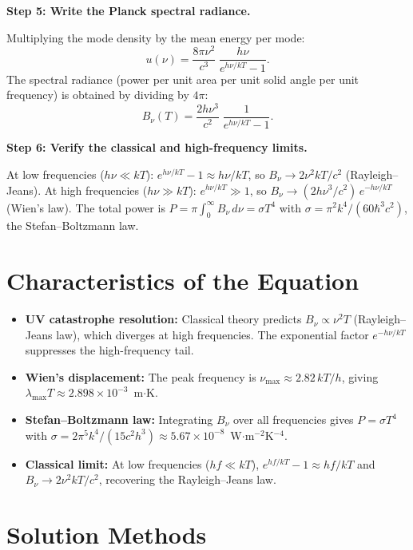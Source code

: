 \textbf{Step 5: Write the Planck spectral radiance.}

Multiplying the mode density by the mean energy per mode:
\begin{equation}
u(\nu) = \frac{8\pi\nu^{2}}{c^{3}}\;\frac{h\nu}{e^{h\nu/kT}-1}.
\end{equation}
The spectral radiance (power per unit area per unit solid angle per unit frequency) is obtained by dividing by $4\pi$:
\begin{equation}
\boxed{\;B_{\nu}(T) = \frac{2h\nu^{3}}{c^{2}}\;\frac{1}{e^{h\nu/kT}-1}.\;}
\end{equation}

\textbf{Step 6: Verify the classical and high-frequency limits.}

At low frequencies ($h\nu \ll kT$): $e^{h\nu/kT} - 1 \approx h\nu/kT$, so $B_{\nu} \to 2\nu^{2}kT/c^{2}$ (Rayleigh--Jeans). At high frequencies ($h\nu \gg kT$): $e^{h\nu/kT} \gg 1$, so $B_{\nu} \to (2h\nu^{3}/c^{2})\,e^{-h\nu/kT}$ (Wien's law). The total power is $P = \pi\int_0^{\infty} B_{\nu}\,d\nu = \sigma T^{4}$ with $\sigma = \pi^{2}k^{4}/(60\hbar^{3}c^{2})$, the Stefan--Boltzmann law.

\section*{Characteristics of the Equation}

\begin{itemize}
  \item \textbf{UV catastrophe resolution:} Classical theory predicts $B_{\nu} \propto \nu^{2}T$ (Rayleigh--Jeans law), which diverges at high frequencies. The exponential factor $e^{-h\nu/kT}$ suppresses the high-frequency tail.
  \item \textbf{Wien's displacement:} The peak frequency is $\nu_{\text{max}} \approx 2.82\,kT/h$, giving $\lambda_{\text{max}} T \approx 2.898 \times 10^{-3}$~m$\cdot$K.
  \item \textbf{Stefan--Boltzmann law:} Integrating $B_{\nu}$ over all frequencies gives $P = \sigma T^{4}$ with $\sigma = 2\pi^{5}k^{4}/(15c^{2}h^{3}) \approx 5.67 \times 10^{-8}$~W$\cdot$m$^{-2}$K$^{-4}$.
  \item \textbf{Classical limit:} At low frequencies ($hf \ll kT$), $e^{hf/kT} - 1 \approx hf/kT$ and $B_{\nu} \to 2\nu^{2}kT/c^{2}$, recovering the Rayleigh--Jeans law.
\end{itemize}
\section*{Solution Methods}

